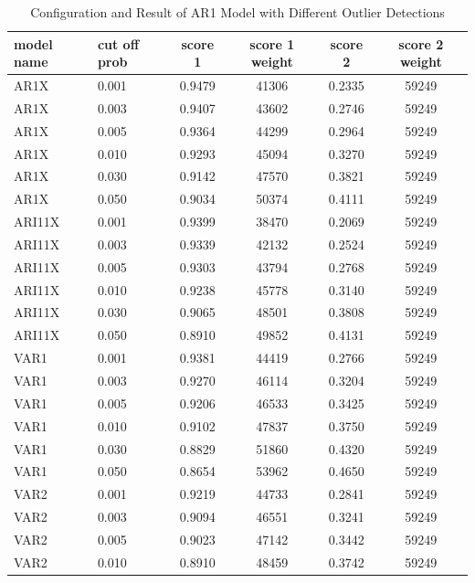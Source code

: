 \documentclass{article}
\begin{document}
\begin{table}[htbp]
  \begin{center}
    \caption{Configuration and Result of AR1 Model with Different Outlier Detections}
    \label{tab:tab1.3.6}
    \begin{tabular}{l|l|*{4}{c}} \textbf{model name} & \textbf{cut off prob} &
      \textbf{score 1} & \textbf{score 1 weight} & \textbf{score 2} &
      \textbf{score 2 weight} \\
      \hline
      AR1X & 0.001 & 0.9479 & 41306 & 0.2335 & 59249\\
      AR1X & 0.003 & 0.9407 & 43602 & 0.2746 & 59249\\
      AR1X & 0.005 & 0.9364 & 44299 & 0.2964 & 59249\\
      AR1X & 0.010 & 0.9293 & 45094 & 0.3270 & 59249\\
      AR1X & 0.030 & 0.9142 & 47570 & 0.3821 & 59249\\
      AR1X & 0.050 & 0.9034 & 50374 & 0.4111 & 59249\\
      ARI11X & 0.001 & 0.9399 & 38470 & 0.2069 & 59249\\
      ARI11X & 0.003 & 0.9339 & 42132 & 0.2524 & 59249\\
      ARI11X & 0.005 & 0.9303 & 43794 & 0.2768 & 59249\\
      ARI11X & 0.010 & 0.9238 & 45778 & 0.3140 & 59249\\
      ARI11X & 0.030 & 0.9065 & 48501 & 0.3808 & 59249\\
      ARI11X & 0.050 & 0.8910 & 49852 & 0.4131 & 59249\\
      VAR1 & 0.001 & 0.9381 & 44419 & 0.2766 & 59249\\
      VAR1 & 0.003 & 0.9270 & 46114 & 0.3204 & 59249\\
      VAR1 & 0.005 & 0.9206 & 46533 & 0.3425 & 59249\\
      VAR1 & 0.010 & 0.9102 & 47837 & 0.3750 & 59249\\
      VAR1 & 0.030 & 0.8829 & 51860 & 0.4320 & 59249\\
      VAR1 & 0.050 & 0.8654 & 53962 & 0.4650 & 59249\\
      VAR2 & 0.001 & 0.9219 & 44733 & 0.2841 & 59249\\
      VAR2 & 0.003 & 0.9094 & 46551 & 0.3241 & 59249\\
      VAR2 & 0.005 & 0.9023 & 47142 & 0.3442 & 59249\\
      VAR2 & 0.010 & 0.8910 & 48459 & 0.3742 & 59249\\

\end{tabular}
\end{center}
\end{table}
\end{document}
